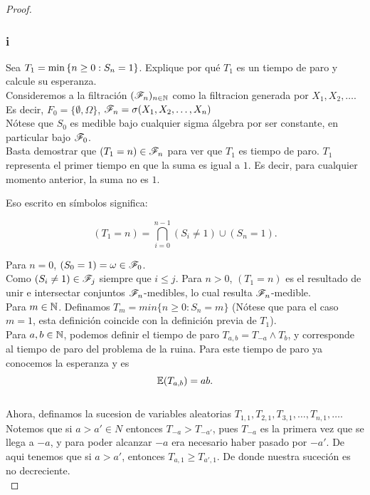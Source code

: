 \begin{proof}

		\subsubsection{i}
		Sea $T_1=\min\left\{ n\geq 0:S_n=1\right\} $. Explique por qu\'e $T_1$ es un 
		tiempo de paro y calcule su esperanza.\\
		
			Consideremos a la filtración $(\mathscr{F}_n)_{n\in\mathbb{N}}$ como la filtracion 
			generada por $X_1, X_2, \dots$.\\

			Es decir, $F_0 = \{\emptyset, \Omega\}$, $\mathscr{F}_n = \sigma(X_1, X_2, \dots, X_n)$\\
		
			Nótese que $S_0$ es medible bajo cualquier sigma álgebra por ser constante, en particular bajo
			$\mathscr{F}_0$.\\
		
			Basta demostrar que $(T_1 = n) \in \mathscr{F}_n$ para ver que $T_1$ es tiempo de paro. $T_1$ 
			representa el primer tiempo en que la suma es igual a $1$. Es decir, para cualquier 
			momento anterior, la suma no es $1$.
		
			Eso escrito en símbolos significa:
		
			$$(T_1 = n) = \bigcap_{i=0}^{n-1}(S_i \not= 1) \cup (S_n = 1).$$ 
		
			Para $n=0$, $(S_0 = 1) = \omega \in \mathscr{F}_0$. \\
		
			Como $(S_i \not= 1) \in \mathscr{F}_j$ siempre que $i \leq j$. Para $n>0$, $(T_1 = n)$ es el resultado de 
			unir e intersectar conjuntos $\mathscr{F}_n$-medibles, lo cual resulta $\mathscr{F}_n$-medible.\\
		
			Para $m \in \mathbb{N}$. Definamos $T_m = min\{n \geq 0 : S_n = m\}$ 
			(Nótese que para el caso $m=1$, esta definición	coincide con la definición previa de $T_1$).\\
			
			Para $a,b \in \mathbb{N}$, podemos definir el tiempo de paro $T_{a,b} = T_{-a} \wedge T_b$, y 
			corresponde al 	tiempo de paro del problema de la ruina. Para este tiempo de paro ya conocemos 
			la esperanza y es
			$$\mathbb{E}(T_{a,b}) = ab.$$\\
			
			Ahora, definamos la sucesion de variables aleatorias $T_{1,1}, T_{2,1}, T_{3,1}, \dots, T_{n,1}, 
			\dots$. Notemos que si $a>a' \in N$ entonces $T_{-a} > T_{-a'}$, pues $T_{-a}$ es la primera vez
			que se llega a $-a$, y para poder alcanzar $-a$ era necesario haber pasado por $-a'$.
			De aqui tenemos que si $a>a'$, entonces $T_{a,1} \geq T_{a',1}$. De donde nuestra suceción es 
			no decreciente.\\
			

\end{proof}
